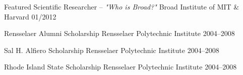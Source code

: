 \begin{cvhonors}

  \cvhonor
    {Featured Scientific Researcher -- \textit{"Who is Broad?"}} %
    {Broad Institute of MIT \& Harvard} %
    {01/2012} %
    
  \cvhonor
    {Rensselaer Alumni Scholarship} %
    {Rensselaer Polytechnic Institute} %
    {2004--2008} %

  \cvhonor
    {Sal H. Alfiero Scholarship} %
    {Rensselaer Polytechnic Institute} %
    {2004--2008} %

  \cvhonor
    {Rhode Island State Scholarship} %
    {Rensselaer Polytechnic Institute} %
    {2004--2008} %

\end{cvhonors}